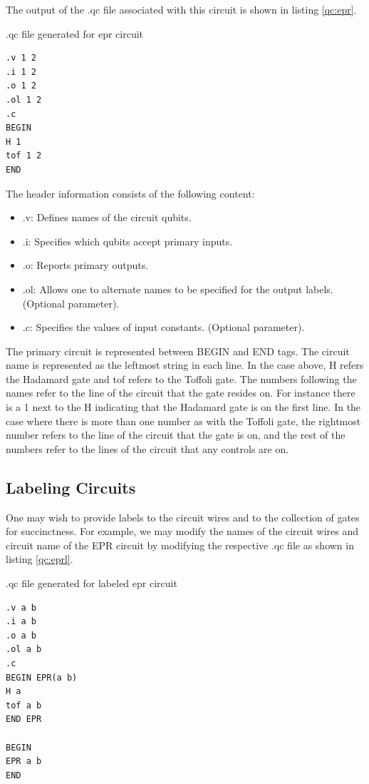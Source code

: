 \documentclass[10pt]{article}
\theoremstyle{definition}
\begin{document}
The output of the .qc file associated with this circuit is shown in listing \ref{qc:epr}.

\begin{program}
\caption{.qc file generated for epr circuit}
\label{qc:epr}
\begin{verbatim}
.v 1 2
.i 1 2
.o 1 2
.ol 1 2
.c
BEGIN
H 1
tof 1 2
END
\end{verbatim}
\end{program}

The header information consists of the following content:

\begin{itemize}
\item .v: Defines names of the circuit qubits.
\item .i: Specifies which qubits accept primary inputs.
\item .o: Reports primary outputs.
\item .ol: Allows one to alternate names to be specified for the output labels. (Optional parameter).
\item .c: Specifies the values of input constants. (Optional parameter).
\end{itemize}

The primary circuit is represented between BEGIN and END tags. The circuit name is represented as the leftmost string in each line. In the case above, H refers the Hadamard gate and tof refers to the Toffoli gate. The numbers following the names refer to the line of the circuit that the gate resides on. For instance there is a 1 next to the H indicating that the Hadamard gate is on the first line. In the case where there is more than one number as with the Toffoli gate, the rightmost number refers to the line of the circuit that the gate is on, and the rest of the numbers refer to the lines of the circuit that any controls are on.

\subsection{Labeling Circuits}\label{sec:LabelingCircuits}

One may wish to provide labels to the circuit wires and to the collection of gates for succinctness. For example, we may modify the names of the circuit wires and circuit name of the EPR circuit by modifying the respective .qc file as shown in listing \ref{qc:eprl}.

\begin{program}
\caption{ .qc file generated for labeled epr circuit}
\label{qc:eprl}
\begin{verbatim}
.v a b
.i a b
.o a b
.ol a b
.c
BEGIN EPR(a b)
H a
tof a b
END EPR

BEGIN
EPR a b
END
\end{verbatim}
\end{program}
\end{document}

